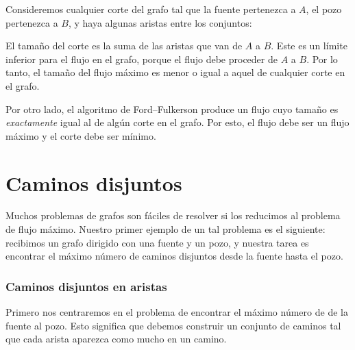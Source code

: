 Consideremos cualquier corte del grafo tal que la fuente pertenezca
a $A$, el pozo pertenezca a $B$, y haya algunas aristas entre los
conjuntos:

\begin{center}
\end{center}

El tamaño del corte es la suma de las aristas que van de $A$ a $B$.
Este es un límite inferior para el flujo en el grafo, porque el flujo
debe proceder de $A$ a $B$. Por lo tanto, el tamaño del flujo máximo
es menor o igual a aquel de cualquier corte en el grafo.

Por otro lado, el algoritmo de Ford--Fulkerson produce un flujo
cuyo tamaño es \emph{exactamente} igual al de algún corte en el grafo.
Por esto, el flujo debe ser un flujo máximo y el corte debe ser mínimo.

\section{Caminos disjuntos}

Muchos problemas de grafos son fáciles de resolver si los reducimos al
problema de flujo máximo. Nuestro primer ejemplo de un tal problema es el
siguiente: recibimos un grafo dirigido con una fuente y un pozo, y
nuestra tarea es encontrar el máximo número de caminos disjuntos desde
la fuente hasta el pozo.

\subsubsection{Caminos disjuntos en aristas}

Primero nos centraremos en el problema de encontrar el máximo número
de  de la fuente al pozo. Esto
significa que debemos construir un conjunto de caminos tal que cada
arista aparezca como mucho en un camino.

